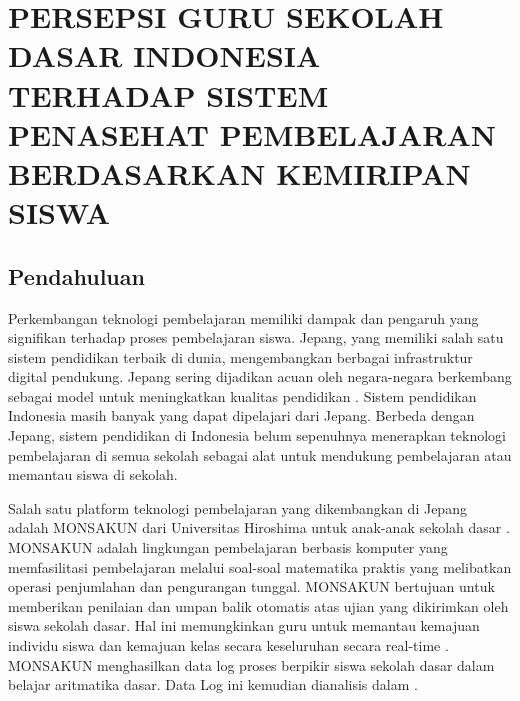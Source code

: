 \chapter{PERSEPSI GURU SEKOLAH DASAR INDONESIA TERHADAP SISTEM PENASEHAT PEMBELAJARAN BERDASARKAN KEMIRIPAN SISWA}

\section{Pendahuluan}
    Perkembangan teknologi pembelajaran memiliki dampak dan pengaruh yang signifikan terhadap proses pembelajaran siswa. Jepang, yang memiliki salah satu sistem pendidikan terbaik di dunia, mengembangkan berbagai infrastruktur digital pendukung. Jepang sering dijadikan acuan oleh negara-negara berkembang sebagai model untuk meningkatkan kualitas pendidikan \citep{Vicente2024}. Sistem pendidikan Indonesia masih banyak yang dapat dipelajari dari Jepang. Berbeda dengan Jepang, sistem pendidikan di Indonesia belum sepenuhnya menerapkan teknologi pembelajaran di semua sekolah sebagai alat untuk mendukung pembelajaran atau memantau siswa di sekolah.
    
    Salah satu platform teknologi pembelajaran yang dikembangkan di Jepang adalah MONSAKUN dari Universitas Hiroshima untuk anak-anak sekolah dasar \citep{Hirashima2014}. MONSAKUN adalah lingkungan pembelajaran berbasis komputer yang memfasilitasi pembelajaran melalui soal-soal matematika praktis yang melibatkan operasi penjumlahan dan pengurangan tunggal. MONSAKUN bertujuan untuk memberikan penilaian dan umpan balik otomatis atas ujian yang dikirimkan oleh siswa sekolah dasar. Hal ini memungkinkan guru untuk memantau kemajuan individu siswa dan kemajuan kelas secara keseluruhan secara real-time \citep{Hirashima2007}. MONSAKUN menghasilkan data log proses berpikir siswa sekolah dasar dalam belajar aritmatika dasar. Data Log ini kemudian dianalisis dalam \citep{Hasanah2015}.
    
